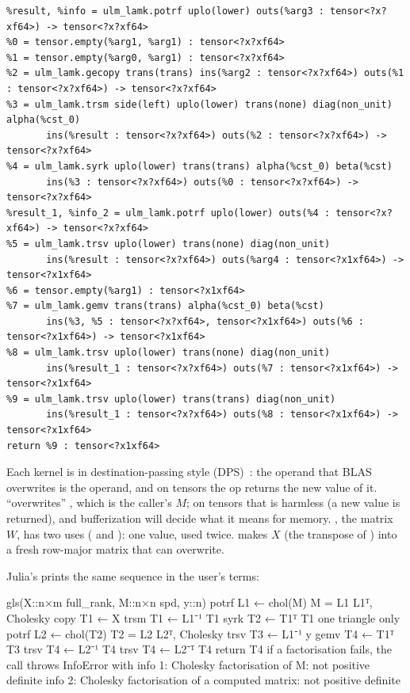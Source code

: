 \begin{lstlisting}
%result, %info = ulm_lamk.potrf uplo(lower) outs(%arg3 : tensor<?x?xf64>) -> tensor<?x?xf64>
%0 = tensor.empty(%arg1, %arg1) : tensor<?x?xf64>
%1 = tensor.empty(%arg0, %arg1) : tensor<?x?xf64>
%2 = ulm_lamk.gecopy trans(trans) ins(%arg2 : tensor<?x?xf64>) outs(%1 : tensor<?x?xf64>) -> tensor<?x?xf64>
%3 = ulm_lamk.trsm side(left) uplo(lower) trans(none) diag(non_unit) alpha(%cst_0)
       ins(%result : tensor<?x?xf64>) outs(%2 : tensor<?x?xf64>) -> tensor<?x?xf64>
%4 = ulm_lamk.syrk uplo(lower) trans(trans) alpha(%cst_0) beta(%cst)
       ins(%3 : tensor<?x?xf64>) outs(%0 : tensor<?x?xf64>) -> tensor<?x?xf64>
%result_1, %info_2 = ulm_lamk.potrf uplo(lower) outs(%4 : tensor<?x?xf64>) -> tensor<?x?xf64>
%5 = ulm_lamk.trsv uplo(lower) trans(none) diag(non_unit)
       ins(%result : tensor<?x?xf64>) outs(%arg4 : tensor<?x1xf64>) -> tensor<?x1xf64>
%6 = tensor.empty(%arg1) : tensor<?x1xf64>
%7 = ulm_lamk.gemv trans(trans) alpha(%cst_0) beta(%cst)
       ins(%3, %5 : tensor<?x?xf64>, tensor<?x1xf64>) outs(%6 : tensor<?x1xf64>) -> tensor<?x1xf64>
%8 = ulm_lamk.trsv uplo(lower) trans(none) diag(non_unit)
       ins(%result_1 : tensor<?x?xf64>) outs(%7 : tensor<?x1xf64>) -> tensor<?x1xf64>
%9 = ulm_lamk.trsv uplo(lower) trans(trans) diag(non_unit)
       ins(%result_1 : tensor<?x?xf64>) outs(%8 : tensor<?x1xf64>) -> tensor<?x1xf64>
return %9 : tensor<?x1xf64>
\end{lstlisting}

Each kernel is in destination-passing style (DPS)~\cite{dps}: the operand that BLAS
overwrites is the  operand, and on tensors the op returns the
new value of it.  ``overwrites'' , which is the
caller's \(M\); on tensors that is harmless (a new value is returned), and
bufferization will decide what it means for memory. , the matrix
\(W\), has two uses ( and ): one value, used twice.
 makes \(X\) (the transpose of )
into a fresh row-major matrix that  can overwrite.

Julia's  prints the same sequence in the user's terms:

\begin{textout}
gls(X::n×m full_rank, M::n×n spd, y::n)
  potrf    L1 ← chol(M)                      M = L1 L1ᵀ, Cholesky
  copy     T1 ← X
  trsm     T1 ← L1⁻¹ T1
  syrk     T2 ← T1ᵀ T1                       one triangle only
  potrf    L2 ← chol(T2)                     T2 = L2 L2ᵀ, Cholesky
  trsv     T3 ← L1⁻¹ y
  gemv     T4 ← T1ᵀ T3
  trsv     T4 ← L2⁻¹ T4
  trsv     T4 ← L2⁻ᵀ T4
  return T4
if a factorisation fails, the call throws InfoError with
  info 1:  Cholesky factorisation of M: not positive definite
  info 2:  Cholesky factorisation of a computed matrix: not positive definite
\end{textout}

